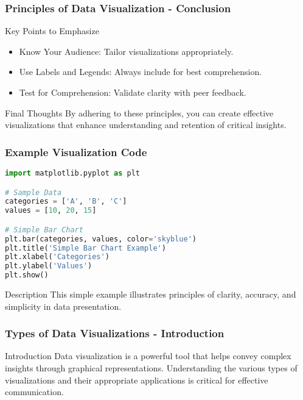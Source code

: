 \documentclass{beamer}
\begin{document}
\begin{frame}[fragile]
    \frametitle{Principles of Data Visualization - Conclusion}
    \begin{block}{Key Points to Emphasize}
        \begin{itemize}
            \item Know Your Audience: Tailor visualizations appropriately.
            \item Use Labels and Legends: Always include for best comprehension.
            \item Test for Comprehension: Validate clarity with peer feedback.
        \end{itemize}
    \end{block}
    \begin{block}{Final Thoughts}
        By adhering to these principles, you can create effective visualizations that enhance understanding and retention of critical insights.
    \end{block}
\end{frame}

\begin{frame}[fragile]
    \frametitle{Example Visualization Code}
    \begin{lstlisting}[language=Python]
import matplotlib.pyplot as plt

# Sample Data
categories = ['A', 'B', 'C']
values = [10, 20, 15]

# Simple Bar Chart
plt.bar(categories, values, color='skyblue')
plt.title('Simple Bar Chart Example')
plt.xlabel('Categories')
plt.ylabel('Values')
plt.show()
    \end{lstlisting}
    \begin{block}{Description}
        This simple example illustrates principles of clarity, accuracy, and simplicity in data presentation.
    \end{block}
\end{frame}

\begin{frame}[fragile]
    \frametitle{Types of Data Visualizations - Introduction}
    \begin{block}{Introduction}
        Data visualization is a powerful tool that helps convey complex insights through graphical representations. Understanding the various types of visualizations and their appropriate applications is critical for effective communication.
    \end{block}
\end{frame}
\end{document}
